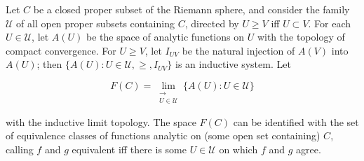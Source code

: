 Let $C$ be a closed proper subset of the Riemann sphere, and consider the family $\mathcal{U}$ of all open proper subsets containing $C$, directed by $U \geq V$ iff $U \subset V$. For each $U \in \mathcal{U}$, let $A(U)$ be the space of analytic functions on $U$ with the topology of compact convergence. For $U \geq V$, let $I_{UV}$ be the natural injection of $A(V)$ into $A(U)$; then $\{A(U): U \in \mathcal{U}, \geq, I_{UV}\}$ is an inductive system. Let

$$F(C) = \lim_{\substack{\longrightarrow \\ U \in \mathcal{U}}} \{A(U): U \in \mathcal{U}\}$$

with the inductive limit topology. The space $F(C)$ can be identified with the set of equivalence classes of functions analytic on (some open set containing) $C$, calling $f$ and $g$ equivalent iff there is some $U \in \mathcal{U}$ on which $f$ and $g$ agree.
